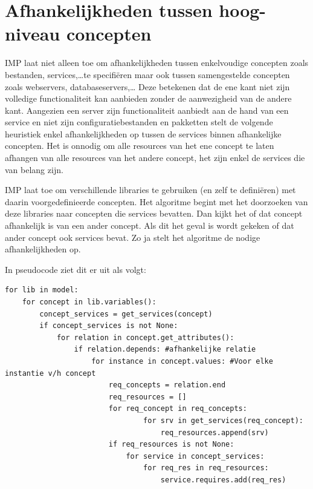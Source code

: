 \section{Afhankelijkheden tussen hoog-niveau concepten}
\label{sec:hoog_niveau_relaties}
IMP laat niet alleen toe om afhankelijkheden tussen enkelvoudige concepten zoals bestanden, services,\ldots te specifi\"eren maar ook tussen samengestelde concepten zoals webservers, databaseservers,\ldots
Deze betekenen dat de ene kant niet zijn volledige functionaliteit kan aanbieden zonder de aanwezigheid van de andere kant.
Aangezien een server zijn functionaliteit aanbiedt aan de hand van een service en niet zijn configuratiebestanden en pakketten stelt de volgende heuristiek enkel afhankelijkheden op tussen de services binnen afhankelijke concepten.
Het is onnodig om alle resources van het ene concept te laten afhangen van alle resources van het andere concept, het zijn enkel de services die van belang zijn.

IMP laat toe om verschillende libraries te gebruiken (en zelf te defini\"eren) met daarin voorgedefinieerde concepten. 
Het algoritme begint met het doorzoeken van deze libraries naar concepten die services bevatten.
Dan kijkt het of dat concept afhankelijk is van een ander concept.
Als dit het geval is wordt gekeken of dat ander concept ook services bevat.
Zo ja stelt het algoritme de nodige afhankelijkheden op.

In pseudocode ziet dit er uit als volgt:

\begin{minipage}{\textwidth}
\begin{lstlisting}
for lib in model:
    for concept in lib.variables():
        concept_services = get_services(concept)
        if concept_services is not None:
            for relation in concept.get_attributes():
                if relation.depends: #afhankelijke relatie
                    for instance in concept.values: #Voor elke instantie v/h concept
                        req_concepts = relation.end
                        req_resources = []
                        for req_concept in req_concepts:
                                for srv in get_services(req_concept):
                                    req_resources.append(srv)
                        if req_resources is not None: 
                            for service in concept_services:
                                for req_res in req_resources:
                                    service.requires.add(req_res)
\end{lstlisting}
\end{minipage}

